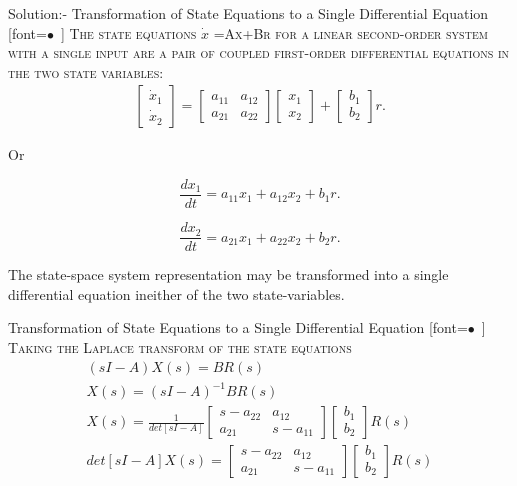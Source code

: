 \documentclass[journal,12pt,twocolumn]{IEEEtran}
\renewcommand\thesection{\arabic{section}}
\begin{document}
\begin{enumerate}[label=\arabic*.,ref=\thesection.\theenumi]
\begin{tabular}{cc}
    \end{tabular}




{Solution:- }
 Transformation of State Equations to a Single Differential Equation
[font=$\bullet$~\normalfont\scshape\color{red!50!black}]
The state equations $\dot{x}$ =Ax+Br for a linear second-order system with a single input are a pair of coupled first-order differential equations in the two state variables:
\begin{align}
\left[ \begin{array}{c} \dot{x}_1 \\ \dot{x}_2 
\end{array} 
\right] = 
\begin{bmatrix} a_{11} & a_{12} \\ a_{21} & a_{22} 
\end{bmatrix} 
\left[ 
\begin{array}{c} x_1 \\ x_2 
\end{array}
\right]
+
\left[
\begin{array}{c} b_1 \\ b_2 
\end{array}
\right]
r.
\end{align}

Or

$$\dfrac{dx_1}{dt}= a_{11}x_1 + a_{12}x_2 + b_1r.$$


$$\dfrac{dx_2}{dt}= a_{21}x_1 + a_{22}x_2 + b_2r.$$


The state-space system representation may be transformed into a single differential equation ineither of the two state-variables.





{Transformation of State Equations to a Single Differential Equation}
[font=$\bullet$~\normalfont\scshape\color{red!50!black}]
 Taking the Laplace transform of the state equations
\begin{align}
(sI - A)X(s)  =  BR(s)
\\
X(s)  =  (sI - A)^{-1}BR(s)
\\
X(s)  = \frac{1}{det[sI - A]}\begin{bmatrix} s - a_{22} & a_{12} \\ a_{21} & s - a_{11} 
\end{bmatrix}\left[\begin{array}{c} b_1 \\ b_2\end{array}\right]R(s) 
\\
det [sI - A]X(s) = \begin{bmatrix} s - a_{22} & a_{12} \\ a_{21} & s - a_{11} 
\end{bmatrix}\left[\begin{array}{c} b_1 \\ b_2\end{array}\right]R(s)
\end{align}





\end{enumerate}
\end{document}
